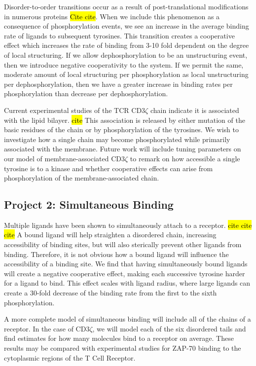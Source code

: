 \documentclass[onecolumn]{article}
\begin{document}
Disorder-to-order transitions occur as a result of post-translational modifications in numerous proteins \hl{Cite cite}. When we include this phenomenon as a consequence of phosphorylation events, we see an increase in the average binding rate of ligands to subsequent tyrosines. This transition creates a cooperative effect which increases the rate of binding from 3-10 fold dependent on the degree of local structuring. If we allow dephosphorylation to be an unstructuring event, then we introduce negative cooperativity to the system.  If we permit the same, moderate amount of local structuring per phosphorylation as local unstructuring per dephosphorylation, then we have a greater increase in binding rates per phosphorylation than decrease per dephosphorylation.

Current experimental studies of the TCR CD3$\zeta$ chain indicate it is associated with the lipid bilayer. \hl{cite} This association is released by either mutation of the basic residues of the chain or by phosphorylation of the tyrosines. We wish to investigate how a single chain may become phosphorylated while primarily associated with the membrane. Future work will include tuning parameters on our model of membrane-associated CD3$\zeta$ to remark on how accessible a single tyrosine is to a kinase and whether cooperative effects can arise from phosphorylation of the membrane-associated chain.

\subsection*{Project 2: Simultaneous Binding}

Multiple ligands have been shown to simultaneously attach to a receptor. \hl{cite cite cite} A bound ligand will help straighten a disordered chain, increasing accessibility of binding sites, but will also sterically prevent other ligands from binding. Therefore, it is not obvious how a bound ligand will influence the accessibility of a binding site. We find that having simultaneously bound ligands will create a negative cooperative effect, making each successive tyrosine harder for a ligand to bind. This effect scales with ligand radius, where large ligands can create a 30-fold decrease of the binding rate from the first to the sixth phosphorylation.

A more complete model of simultaneous binding will include all of the chains of a receptor.  In the case of CD3$\zeta$, we will model each of the six disordered tails and find estimates for how many molecules bind to a receptor on average. These results may be compared with experimental studies for ZAP-70 binding to the cytoplasmic regions of the T Cell Receptor.
\end{document}
